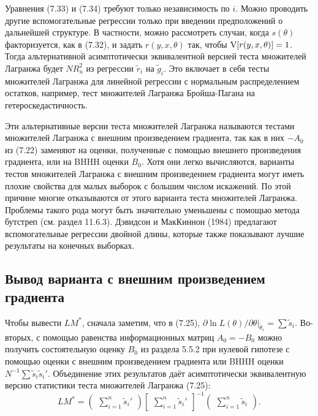 Уравнения (7.33) и (7.34) требуют только независимость по $i$. Можно проводить другие вспомогательные регрессии только при введении предположений о дальнейшей структуре. В частности, можно рассмотреть случаи, когда $s(\theta)$ факторизуется, как в (7.32), и задать $r(y, x, \theta)$ так, чтобы $\mathrm{V}[r(y, x, \theta)] = 1$. Тогда альтернативной асимптотически эквивалентной версией теста множителей Лагранжа будет $NR_u^2$ из регрессии $\tilde{r}_i$ на $\tilde{g}_i$. Это включает в себя тесты множителей Лагранжа для линейной регрессии с нормальным распределением остатков, например, тест множителей Лагранжа Бройша-Пагана на гетероскедастичность.

Эти альтернативные версии теста множителей Лагранжа называются тестами множителей Лагранжа с внешним произведением градиента, так как в них $-A_0$ из (7.22) заменяют на оценки, полученные с помощью внешнего произведения градиента, или на BHHH оценки $B_0$. Хотя они легко вычисляются, варианты тестов множителей Лагранжа с внешним произведением градиента могут иметь плохие свойства для малых выборок с большим числом искажений. По этой причине многие отказываются от этого варианта теста множителей Лагранжа. Проблемы такого рода могут быть значительно уменьшены с помощью метода бутстреп (см. раздел 11.6.3). Дэвидсон и МакКиннон (1984) предлагают вспомогательные регрессии двойной длины, которые также показывают лучшие результаты на конечных выборках.

\subsection{Вывод варианта с внешним произведением градиента}

Чтобы вывести $LM^*$, сначала заметим, что в (7.25), $\partial{\ln L(\theta)/\partial{\theta}}|_{\tilde{\theta}_r} = \sum \tilde{s}_i$. Во-вторых, с помощью равенства информационных матриц $A_0 = - B_0$ можно получить состоятельную оценку $B_0$ из раздела 5.5.2 при нулевой гипотезе с помощью оценки с внешним произведением градиента или BHHH оценки $N^{-1}\sum \tilde{s}_i\tilde{s}_i'$. Объединение этих результатов даёт асимптотически эквивалентную версию статистики теста множителей Лагранжа (7.25):
\begin{equation}
LM^* = \begin{pmatrix} \sum_{i=1}^n \tilde{s}_i' \end{pmatrix} \begin{bmatrix} \sum_{i=1}^n \tilde{s}_i' \end{bmatrix}^{-1} \begin{pmatrix} \sum_{i=1}^n \tilde{s}_i \end{pmatrix}.
\end{equation}

